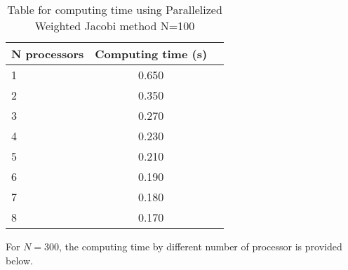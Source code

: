\documentclass[12pt]{article}
\begin{document}
\begin{table}[H]
	\centering
	\label{tab:cg}
	\begin{tabular}{lcr}
	\bfseries N {processors} & Computing time (s)\\ \hline
	1 & 0.650\\
	2 & 0.350\\
	3 & 0.270\\
	4 & 0.230\\
	5 & 0.210\\
	6 & 0.190\\
	7 & 0.180\\
	8 & 0.170\\
	\end{tabular}
	\caption[This is optional caption, without reference]{Table for computing time using Parallelized Weighted Jacobi method N=100}
\end{table}

For $N=300$, the computing time by different number of processor is provided below.
\end{document}

